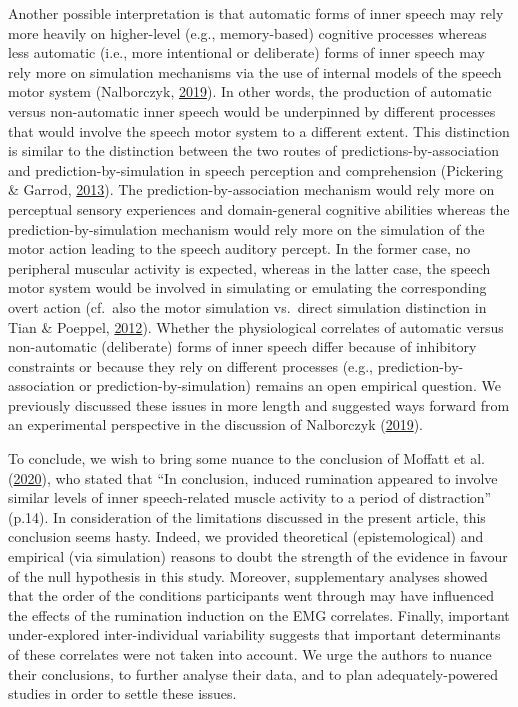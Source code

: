 \documentclass[
  english,
  man, donotrepeattitle,floatsintext]{apa6}
\begin{document}
Another possible interpretation is that automatic forms of inner speech may rely more heavily on higher-level (e.g., memory-based) cognitive processes whereas less automatic (i.e., more intentional or deliberate) forms of inner speech may rely more on simulation mechanisms via the use of internal models of the speech motor system (Nalborczyk, \protect\hyperlink{ref-nalborczyk_understanding_2019}{2019}). In other words, the production of automatic versus non-automatic inner speech would be underpinned by different processes that would involve the speech motor system to a different extent. This distinction is similar to the distinction between the two routes of predictions-by-association and prediction-by-simulation in speech perception and comprehension (Pickering \& Garrod, \protect\hyperlink{ref-pickering_integrated_2013}{2013}). The prediction-by-association mechanism would rely more on perceptual sensory experiences and domain-general cognitive abilities whereas the prediction-by-simulation mechanism would rely more on the simulation of the motor action leading to the speech auditory percept. In the former case, no peripheral muscular activity is expected, whereas in the latter case, the speech motor system would be involved in simulating or emulating the corresponding overt action (cf.~also the motor simulation vs.~direct simulation distinction in Tian \& Poeppel, \protect\hyperlink{ref-tian_mental_2012}{2012}). Whether the physiological correlates of automatic versus non-automatic (deliberate) forms of inner speech differ because of inhibitory constraints or because they rely on different processes (e.g., prediction-by-association or prediction-by-simulation) remains an open empirical question. We previously discussed these issues in more length and suggested ways forward from an experimental perspective in the discussion of Nalborczyk (\protect\hyperlink{ref-nalborczyk_understanding_2019}{2019}).

To conclude, we wish to bring some nuance to the conclusion of Moffatt et al. (\protect\hyperlink{ref-moffatt_inner_2020}{2020}), who stated that ``In conclusion, induced rumination appeared to involve similar levels of inner speech-related muscle activity to a period of distraction'' (p.14). In consideration of the limitations discussed in the present article, this conclusion seems hasty. Indeed, we provided theoretical (epistemological) and empirical (via simulation) reasons to doubt the strength of the evidence in favour of the null hypothesis in this study. Moreover, supplementary analyses showed that the order of the conditions participants went through may have influenced the effects of the rumination induction on the EMG correlates. Finally, important under-explored inter-individual variability suggests that important determinants of these correlates were not taken into account. We urge the authors to nuance their conclusions, to further analyse their data, and to plan adequately-powered studies in order to settle these issues.
\end{document}
